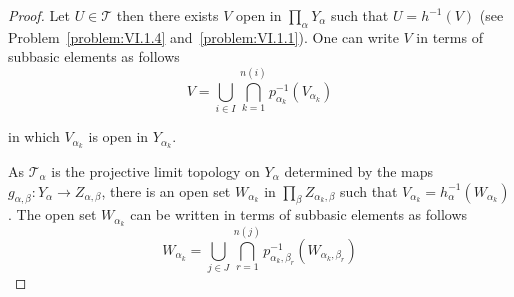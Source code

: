 \begin{proof}
	Let \( U \in \mathscr{T} \) then there exists \( V \) open in \( \prod_{\alpha} Y_{\alpha} \) such that \( U = h^{-1}(V) \) (see Problem~\ref{problem:VI.1.4} and~\ref{problem:VI.1.1}). One can write \( V \) in terms of subbasic elements as follows
	\[
		V = \bigcup_{i\in I} \bigcap^{n(i)}_{k=1} p_{\alpha_{k}}^{-1}(V_{\alpha_{k}})
	\]

	in which \( V_{\alpha_{k}} \) is open in \( Y_{\alpha_{k}} \).

	As \( \mathscr{T}_{\alpha} \) is the projective limit topology on \( Y_{\alpha} \) determined by the maps \( g_{\alpha,\beta}: Y_{\alpha} \to Z_{\alpha,\beta} \), there is an open set \( W_{\alpha_{k}} \) in \( \prod_{\beta} Z_{\alpha_{k},\beta} \) such that \( V_{\alpha_{k}} = h_{\alpha}^{-1}(W_{\alpha_{k}}) \). The open set \( W_{\alpha_{k}} \) can be written in terms of subbasic elements as follows
	\[
		W_{\alpha_{k}} = \bigcup_{j \in J} \bigcap^{n(j)}_{r=1} p_{\alpha_{k},\beta_{r}}^{-1}(W_{\alpha_{k}, \beta_{r}})
	\]


\end{proof}
